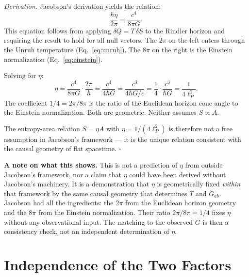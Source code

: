 \documentclass[12pt,a4paper]{article}
\begin{document}
\medskip

\noindent\textit{Derivation.}
Jacobson's derivation yields the relation:
\begin{equation}
\frac{\hbar\eta}{2\pi} = \frac{c^4}{8\pi G}.
\label{eq:jacobson_core}
\end{equation}
This equation follows from applying $\delta Q = T\,\delta S$ to the
Rindler horizon and requiring the result to hold for all null vectors.
The $2\pi$ on the left enters through the Unruh temperature
(Eq.~\ref{eq:unruh}). The $8\pi$ on the right is the Einstein
normalization (Eq.~\ref{eq:einstein}).

Solving for $\eta$:
\begin{equation}
\eta = \frac{c^4}{8\pi G} \cdot \frac{2\pi}{\hbar}
= \frac{c^4}{4\hbar G}
= \frac{c^3}{4\hbar G / c}
= \frac{1}{4} \cdot \frac{c^3}{\hbar G}
= \frac{1}{4\ell_P^2}.
\label{eq:eta_derived}
\end{equation}
The coefficient $1/4 = 2\pi/8\pi$ is the ratio of the Euclidean
horizon cone angle to the Einstein normalization. Both are geometric.
Neither assumes $S \propto A$.

The entropy-area relation $S = \eta A$ with $\eta = 1/(4\ell_P^2)$
is therefore not a free assumption in Jacobson's framework --- it is
the unique relation consistent with the causal geometry of flat
spacetime.
\hfill$\square$

\medskip

\noindent\textbf{A note on what this shows.}
This is not a prediction of $\eta$ from outside Jacobson's framework,
nor a claim that $\eta$ could have been derived without Jacobson's
machinery. It is a demonstration that $\eta$ is geometrically fixed
\textit{within} that framework by the same causal geometry that
determines $T$ and $G_{ab}$. Jacobson had all the ingredients: the
$2\pi$ from the Euclidean horizon geometry and the $8\pi$ from the
Einstein normalization. Their ratio $2\pi/8\pi = 1/4$ fixes $\eta$
without any observational input. The matching to the observed $G$ is
then a consistency check, not an independent determination of $\eta$.

\section{Independence of the Two Factors}
\label{sec:independence}
\end{document}
